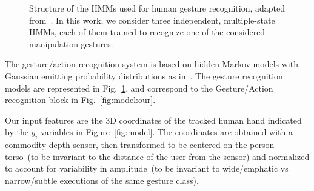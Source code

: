 \newcommand{\myscalefactor}{0.8}

\newcommand{\standardhmm}[1]{
    \node[draw,circle] (hmm#1s1) {$s_1$};
    \node[draw,circle, right of=hmm#1s1] (hmm#1s2) {$s_2$};
    \node[circle, right of=hmm#1s2] (hmm#1s3) {\dots};
    \node[draw,circle, right of=hmm#1s3] (hmm#1s4) {$s_Q$};
    \node[left of=hmm#1s1]  (invisible1) {};
    \node[right of=hmm#1s4] (invisible2) {};
    \path[->] (hmm#1s1) edge (hmm#1s2);
    \path[loop above] (hmm#1s1) edge (hmm#1s1);
    \path[->] (hmm#1s2) edge (hmm#1s3);
    \path[loop above] (hmm#1s2) edge (hmm#1s2);
    \path[dashed] (hmm#1s2) -- (hmm#1s3);
    \path[->] (hmm#1s3) edge (hmm#1s4);
    \path[loop above] (hmm#1s4) edge (hmm#1s4);
    \path[->] (invisible1) edge (hmm#1s1);
    \path[->] (hmm#1s4) edge (invisible2);
}

\newcommand{\modeltwo}{
}

\begin{figure}
  \centering
  \modeltwo
  \caption{Structure of the \acp{HMM} used for human gesture recognition, adapted from~\cite{saponaro:2013:crhri}. In this work, we consider three independent, multiple-state \acp{HMM}, each of them trained to recognize one of the considered manipulation gestures.}
  \label{fig:hmms}
\end{figure}

The gesture/action recognition system is based on hidden Markov models with Gaussian emitting probability distributions as in~\cite{saponaro:2013:crhri}.
The gesture recognition models are represented in Fig.~\ref{fig:hmms}, and correspond to the Gesture/Action recognition block in Fig.~\ref{fig:model:our}.

Our input features are the 3D coordinates of the tracked human hand indicated by the $g_i$ variables in Figure~\ref{fig:model}.
The coordinates are obtained with a commodity depth sensor, then transformed to be centered on the person torso~(to be invariant to the distance of the user from the sensor) and normalized to account for variability in amplitude~(to be invariant to wide/emphatic vs narrow/subtle executions of the same gesture class).

